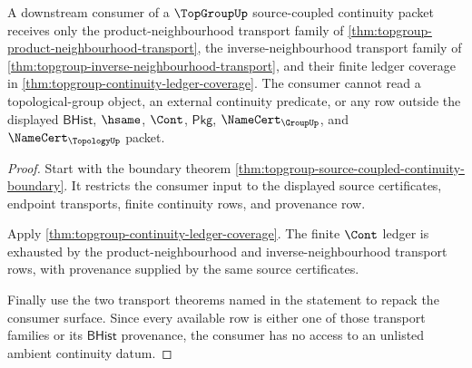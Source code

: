 \begin{theorem}
\label{thm:topgroup-continuity-consumer-exhaustion}
A downstream consumer of a $\TopGroupUp$ source-coupled continuity packet
receives only the product-neighbourhood transport family of
\autoref{thm:topgroup-product-neighbourhood-transport}, the inverse-neighbourhood
transport family of \autoref{thm:topgroup-inverse-neighbourhood-transport}, and
their finite ledger coverage in \autoref{thm:topgroup-continuity-ledger-coverage}.
The consumer cannot read a topological-group object, an external continuity
predicate, or any row outside the displayed $\mathsf{BHist}$, $\hsame$,
$\Cont$, $\mathsf{Pkg}$, $\NameCert_{\GroupUp}$, and
$\NameCert_{\TopologyUp}$ packet.
\end{theorem}
\begin{proof}
Start with the boundary theorem
\autoref{thm:topgroup-source-coupled-continuity-boundary}. It restricts the
consumer input to the displayed source certificates, endpoint transports,
finite continuity rows, and provenance row.

Apply \autoref{thm:topgroup-continuity-ledger-coverage}. The finite $\Cont$
ledger is exhausted by the product-neighbourhood and inverse-neighbourhood
transport rows, with provenance supplied by the same source certificates.

Finally use the two transport theorems named in the statement to repack the
consumer surface. Since every available row is either one of those transport
families or its $\mathsf{BHist}$ provenance, the consumer has no access to an
unlisted ambient continuity datum.
\end{proof}

